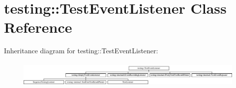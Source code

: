 \hypertarget{classtesting_1_1_test_event_listener}{}\section{testing\+:\+:Test\+Event\+Listener Class Reference}
\label{classtesting_1_1_test_event_listener}
Inheritance diagram for testing\+:\+:Test\+Event\+Listener\+:\begin{figure}[H]
\begin{center}
\leavevmode
\includegraphics[height=1.297297cm]{classtesting_1_1_test_event_listener}
\end{center}
\end{figure}
